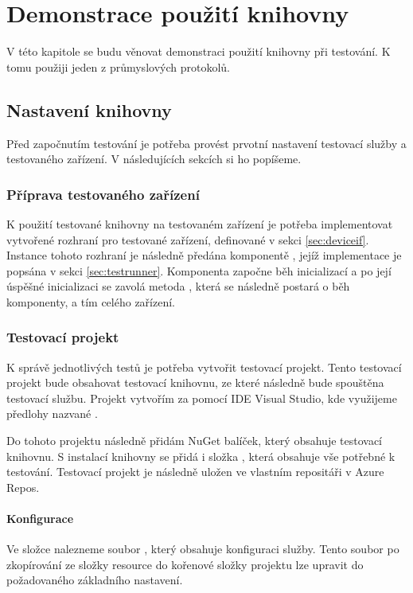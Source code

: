 \chapter{Demonstrace použití knihovny}\label{chap:demonstration}

V této kapitole se budu věnovat demonstraci použití knihovny při testování. K tomu použiji jeden z průmyslových protokolů.

\section{Nastavení knihovny}
Před započnutím testování je potřeba provést prvotní nastavení testovací služby a testovaného zařízení. V následujících sekcích si ho popíšeme.

\subsection{Příprava testovaného zařízení}
K použití testované knihovny na testovaném zařízení je potřeba implementovat vytvořené rozhraní pro testované zařízení, definované v sekci \ref{sec:deviceif}. Instance tohoto rozhraní je následně předána komponentě , jejíž implementace je popsána v sekci \ref{sec:testrunner}. Komponenta  započne běh inicializací a po její úspěšné inicializaci se zavolá metoda , která se následně postará o běh komponenty, a tím celého zařízení.

\subsection{Testovací projekt}
K správě jednotlivých testů je potřeba vytvořit testovací projekt. Tento testovací projekt bude obsahovat testovací knihovnu, ze které následně bude spouštěna testovací službu. Projekt vytvořím za pomocí IDE Visual Studio, kde využijeme předlohy nazvané . 

Do tohoto projektu následně přidám NuGet balíček, který obsahuje testovací knihovnu. S instalací knihovny se přidá i složka , která obsahuje vše potřebné k testování. Testovací projekt je následně uložen ve vlastním repositáři v Azure Repos.  

\subsubsection{Konfigurace}
Ve složce  nalezneme soubor , který obsahuje konfiguraci služby. Tento soubor po zkopírování ze složky resource do kořenové složky projektu lze upravit do požadovaného základního nastavení. 

